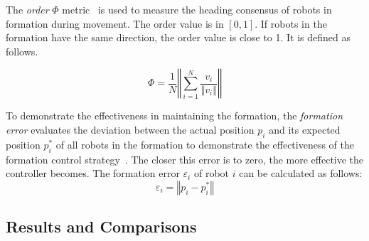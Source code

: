 The \textit{order} $\Phi$ metric~\cite{Vicsek1995} is used to measure the heading consensus of robots in formation during movement. The order value is in $\left[0,1\right]$. If robots in the formation have the same direction, the order value is close to 1. It is defined as follows. 

\begin{equation}
    \Phi=\dfrac{1}{N}\left\Vert\sum_{i=1}^N{\dfrac{v_i}{\left\Vert v_i\right\Vert}}\right\Vert
\end{equation}

To demonstrate the effectiveness in maintaining the formation, the \textit{formation error} evaluates the deviation between the actual position $p_i$ and its expected position $p^*_i$ of all robots in the formation to demonstrate the effectiveness of the formation control strategy~\cite{6798711}. The closer this error is to zero, the more effective the controller becomes. The formation error $\varepsilon_i$ of robot $i$ can be calculated as follows:
\begin{equation}
    \varepsilon_i = \left\Vert p_i-p^*_i\right\Vert
\end{equation}

\subsection{Results and Comparisons}
\label{subsec:results}

